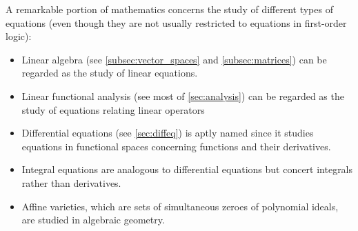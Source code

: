 \begin{remark}\label{remark:equations}
  A remarkable portion of mathematics concerns the study of different types of equations (even though they are not usually restricted to equations in first-order logic):

  \begin{itemize}
    \item Linear algebra (see \cref{subsec:vector_spaces} and \cref{subsec:matrices}) can be regarded as the study of linear equations.
    \item Linear functional analysis (see most of \cref{sec:analysis}) can be regarded as the study of equations relating linear operators
    \item Differential equations (see \cref{sec:diffeq}) is aptly named since it studies equations in functional spaces concerning functions and their derivatives.
    \item Integral equations are analogous to differential equations but concert integrals rather than derivatives.
    \item Affine varieties, which are sets of simultaneous zeroes of polynomial ideals, are studied in algebraic geometry.
  \end{itemize}
\end{remark}
